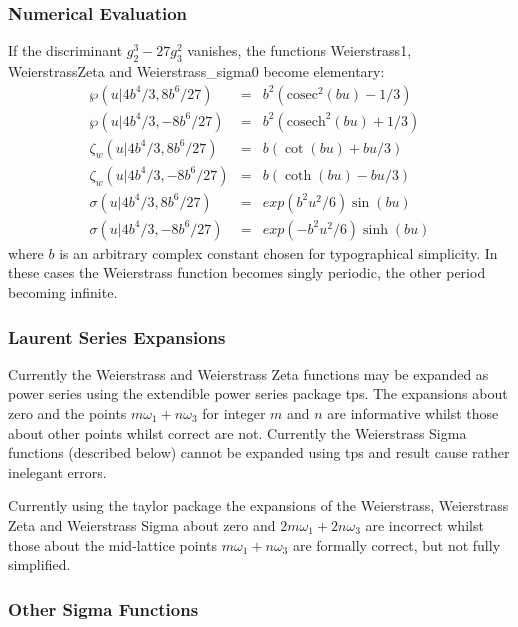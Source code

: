 \subsubsection{Numerical Evaluation}
If the discriminant $g_2^3-27g_3^2$ vanishes, the functions
Weierstrass1, WeierstrassZeta and Weierstrass\_sigma0 become elementary:
\begin{eqnarray*}
\wp(u | 4b^4/3, 8b^6/27) &=& b^2(\mathrm{cosec}^2(b u)-1/3)\\
\wp(u | 4b^4/3, -8b^6/27) &=& b^2(\mathrm{cosech}^2(b u)+1/3)\\
\zeta_w(u |4b^4/3, 8b^6/27) &=& b(\cot(b u)+bu/3)\\
\zeta_w(u |4b^4/3, -8b^6/27) &=& b(\coth(b u)-bu/3)\\
\sigma(u |4b^4/3, 8b^6/27) &=& exp(b^2u^2/6)\sin(bu) \\
\sigma(u |4b^4/3, -8b^6/27) &=& exp(-b^2u^2/6)\sinh(bu)
\end{eqnarray*}
where $b$ is an arbitrary complex constant chosen for typographical simplicity.
In these cases the Weierstrass function becomes singly periodic, the other
period becoming infinite.

\subsubsection{Laurent Series Expansions}
Currently the Weierstrass and Weierstrass Zeta functions may be expanded as
power series using the extendible power series package tps.  The expansions
about zero and the points $m\omega_1+n\omega_3$ for integer $m$ and $n$ are
informative whilst those about other points whilst correct are not. Currently
the Weierstrass Sigma functions (described below) cannot be expanded using tps
and result cause rather inelegant errors.

Currently using the taylor package the expansions of the Weierstrass,
Weierstrass Zeta and Weierstrass Sigma about zero and $2m\omega_1+2n\omega_3$
are incorrect  whilst those about the mid-lattice points $m\omega_1+n\omega_3$
are formally correct, but not fully simplified.

\subsubsection{Other Sigma Functions}
\hypertarget{SIGMA1}{}
\hypertarget{operator:WEIERSTRASS_SIGMA1}{}
\hypertarget{operator:WEIERSTRASS_SIGMA2}{}
\hypertarget{operator:WEIERSTRASS_SIGMA3}{}

